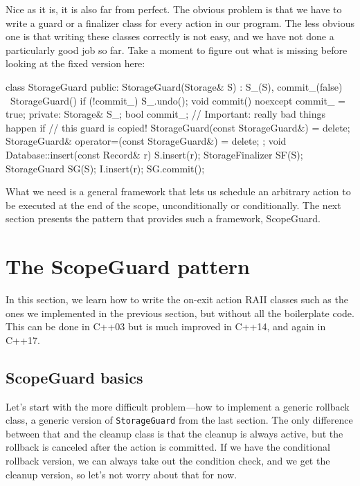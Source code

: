 Nice as it is, it is also far from perfect. The obvious problem is that we have to write a guard or a finalizer class for every action in our program. The less obvious one is that writing these classes correctly is not easy, and we have not done a particularly good job so far. Take a moment to figure out what is missing before looking at the fixed version here:

\begin{code}
class StorageGuard {
  public:
  StorageGuard(Storage& S) : S_(S), commit_(false) {}
  ~StorageGuard() { if (!commit_) S_.undo(); }
  void commit() noexcept { commit_ = true; }
  private:
  Storage& S_;
  bool commit_;
  // Important: really bad things happen if
  // this guard is copied!
  StorageGuard(const StorageGuard&) = delete;
  StorageGuard& operator=(const StorageGuard&) = delete;
};
void Database::insert(const Record& r) {
  S.insert(r);
  StorageFinalizer SF(S);
  StorageGuard SG(S);
  I.insert(r);
  SG.commit();
}
\end{code}

What we need is a general framework that lets us schedule an arbitrary action to be executed at the end of the scope, unconditionally or conditionally. The next section presents the pattern that provides such a framework, ScopeGuard.

\section{The ScopeGuard pattern}

In this section, we learn how to write the on-exit action RAII classes such as the ones we implemented in the previous section, but without all the boilerplate code. This can be done in C++03 but is much improved in C++14, and again in C++17.

\subsection{ScopeGuard basics}

Let's start with the more difficult problem---how to implement a generic rollback class, a generic version of \texttt{StorageGuard} from the last section. The only difference between that and the cleanup class is that the cleanup is always active, but the rollback is canceled after the action is committed. If we have the conditional rollback version, we can always take out the condition check, and we get the cleanup version, so let's not worry about that for now.

